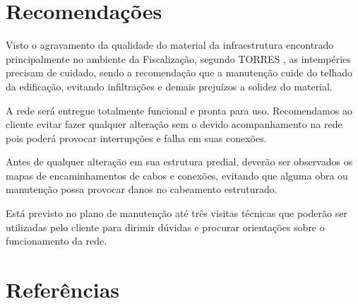 \documentclass[	DIV=calc,%
							paper=a4,%
							fontsize=12pt,%
							onecolumn]{scrartcl}	 					%
\begin{document}
\section{Recomendações}
Visto o agravamento da qualidade do material da infraestrutura encontrado principalmente no ambiente da Fiscalização, segundo TORRES \cite{TORRES}, as intempéries precisam de cuidado, sendo a recomendação que a manutenção cuide do telhado da edificação, evitando infiltrações e demais prejuízos a solidez do material.\par
A rede será entregue totalmente funcional e pronta para uso. Recomendamos ao cliente evitar fazer qualquer alteração sem o devido acompanhamento na rede pois poderá provocar interrupções e falha em suas conexões.\par
Antes de qualquer alteração em sua estrutura predial, deverão ser observados os mapas de encaminhamentos de cabos e conexões, evitando que alguma obra ou manutenção possa provocar danos no cabeamento estruturado.\par
Está previsto no plano de manutenção até três visitas técnicas que poderão ser utilizadas pelo cliente para dirimir dúvidas e procurar orientações sobre o funcionamento da rede.
\clearpage
\section{Referências} %






\renewcommand\refname{} %

  

\end{document}
